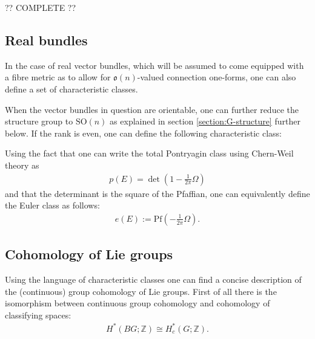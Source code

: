     ?? COMPLETE ??

\subsection{Real bundles}

    In the case of real vector bundles, which will be assumed to come equipped with a fibre metric as to allow for $\mathfrak{o}(n)$-valued connection one-forms, one can also define a set of characteristic classes.


    When the vector bundles in question are orientable, one can further reduce the structure group to $\text{SO}(n)$ as explained in section \ref{section:G-structure} further below. If the rank is even, one can define the following characteristic class:
    \begin{property}
        Using the fact that one can write the total Pontryagin class using Chern-Weil theory as
        \begin{gather}
            p(E) = \det\left(1 - \frac{1}{2\pi}\Omega\right)
        \end{gather}
        and that the determinant is the square of the Pfaffian, one can equivalently define the Euler class as follows:
        \begin{gather}
            e(E) := \text{Pf}\left(-\frac{1}{2\pi}\Omega\right).
        \end{gather}
    \end{property}

\subsection{Cohomology of Lie groups}

    Using the language of characteristic classes one can find a concise description of the (continuous) group cohomology of Lie groups. First of all there is the isomorphism between continuous group cohomology and cohomology of classifying spaces:
    \begin{gather}
        H^*(BG; \mathbb{Z})\cong H^*_c(G; \mathbb{Z}).
    \end{gather}

